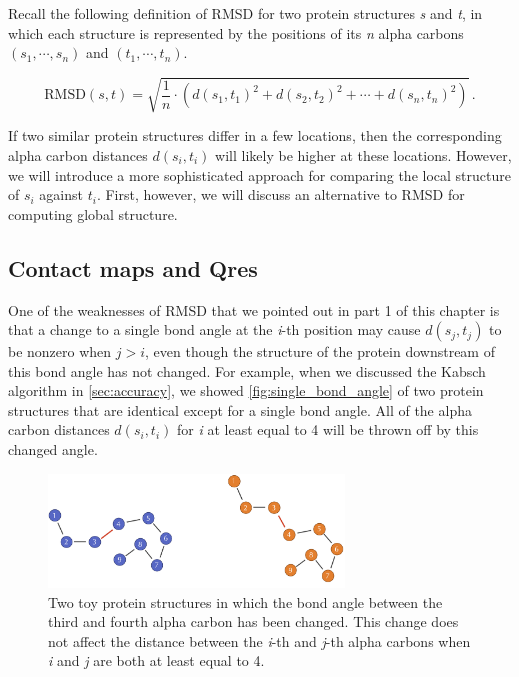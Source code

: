 \begin{qbox}\end{qbox}

Recall the following definition of RMSD for two protein structures \textit{s} and \textit{t}, in which each structure is represented by the positions of its \textit{n} alpha carbons $(s_{1}, \cdots, s_{n})$ and $(t_{1}, \cdots, t_{n})$.

$$\text{RMSD}(s, t) = \sqrt{\dfrac{1}{n} \cdot (d(s_1, t_1)^2 + d(s_2, t_2)^2 + \cdots + d(s_n, t_n)^2)}\,. $$

If two similar protein structures differ in a few locations, then the corresponding alpha carbon distances $d(s_{i}, t_{i})$ will likely be higher at these locations. However, we will introduce a more sophisticated approach for
comparing the local structure of $s_{i}$ against $t_{i}$. First, however, we will discuss an alternative to RMSD for computing global structure.

\FloatBarrier
{}
\subsection{Contact maps and Qres}

One of the weaknesses of RMSD that we pointed out in part 1 of this chapter is that a change to a single bond angle at the \textit{i}-th position may cause $d(s_{j}, t_{j})$ to be nonzero when $j > i$, even though the structure of the protein downstream of this bond angle has not changed. For example, when we discussed the Kabsch algorithm in \autoref{sec:accuracy}, we showed \autoref{fig:single_bond_angle} of two protein structures that are identical except for a single bond angle. All of the alpha carbon distances $d(s_{i}, t_{i})$ for \textit{i} at least equal to 4 will be thrown off by this changed angle.

\begin{figure}[h]
	\centering
	\mySfFamily
	\includegraphics[width = 0.7\textwidth]{../images/single_bond_angle.png}
	\caption{Two toy protein structures in which the bond angle between the third and fourth alpha carbon has been changed. This change does not affect the distance between the \textit{i}-th and \textit{j}-th alpha carbons when \textit{i} and \textit{j} are both at least equal to 4.}
	\label{fig:single_bond_angle}
\end{figure}

